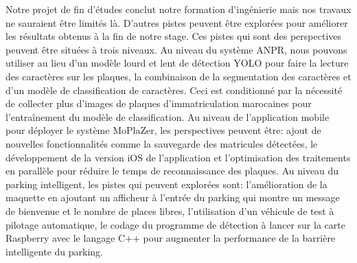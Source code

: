 Notre projet de fin d’études conclut notre formation d’ingénierie mais nos travaux ne sauraient être limités là. D’autres pistes peuvent être explorées pour améliorer les résultats obtenus à la fin de notre stage. Ces pistes qui sont des perspectives peuvent être situées à trois niveaux. Au niveau du système ANPR, nous pouvons utiliser au lieu d’un modèle lourd et lent de détection YOLO pour faire la lecture des caractères sur les plaques, la combinaison de la segmentation des caractères et d’un modèle de classification de caractères. Ceci est conditionné par la nécessité de collecter plus d’images de plaques d’immatriculation marocaines pour l'entraînement du modèle de classification. Au niveau de l’application mobile pour déployer le système MoPlaZer, les perspectives peuvent être: ajout de nouvelles fonctionnalités comme la sauvegarde des matricules détectées, le développement de la version iOS de l’application et l’optimisation des traitements en parallèle pour réduire le temps de reconnaissance des plaques. Au niveau du parking intelligent, les pistes qui peuvent explorées sont: l’amélioration de la maquette en ajoutant un afficheur à l'entrée du parking qui montre un message de bienvenue et le nombre de places libres, l’utilisation d'un véhicule de test à pilotage automatique, le codage du programme de détection à lancer sur la carte Raspberry avec le langage C++ pour augmenter la performance de la barrière intelligente du parking.
